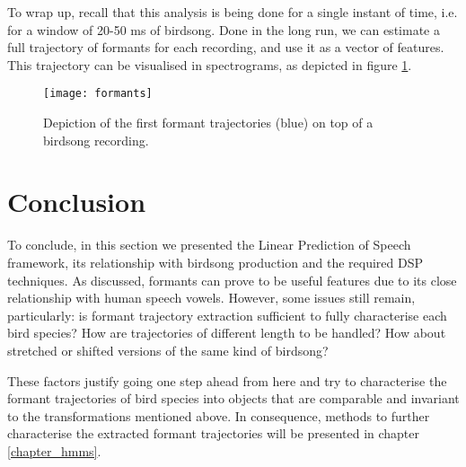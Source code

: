 \documentclass[../main.tex]{subfiles}
\begin{document}
\par To wrap up, recall that this analysis is being done for a single instant of time, i.e. for a window of 20-50 ms of birdsong. Done in the long run, we can estimate a full trajectory of formants for each recording, and use it as a vector of features. This trajectory can be visualised in spectrograms, as depicted in figure \ref{fig_specformants}.
\begin{figure}[t]
\centering
\texttt{[image: formants]}
\caption{Depiction of the first formant trajectories (blue) on top of a birdsong recording.}
\label{fig_specformants}
\end{figure}


\section{Conclusion} \label{section_form_estimation}
To conclude, in this section we presented the Linear Prediction of Speech framework, its relationship with birdsong production and the required DSP techniques. As discussed, formants can prove to be useful features due to its close relationship with human speech vowels. However, some issues still remain, particularly: is formant trajectory extraction sufficient to fully characterise each bird species? How are trajectories of different length to be handled? How about stretched or shifted versions of the same kind of birdsong? 
\par These factors justify going one step ahead from here and try to characterise the formant trajectories of bird species into objects that are comparable and invariant to the transformations mentioned above. In consequence, methods to further characterise the extracted formant trajectories will be presented in chapter \ref{chapter_hmms}. 
    
\end{document}
